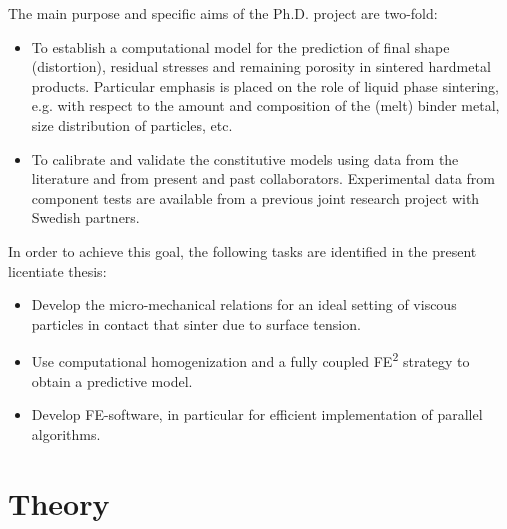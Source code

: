 \documentclass[MikaelDissertation.tex]{subfiles}
\begin{document}
The main purpose and specific aims of the Ph.D. project are two-fold:
\begin{itemize}
\item To establish a computational model for the prediction of final shape (distortion), residual stresses and remaining porosity in sintered hardmetal products.
Particular emphasis is placed on the role of liquid phase sintering, e.g. with respect to the amount and composition of the (melt) binder metal, size distribution of particles, etc.

\item To calibrate and validate the constitutive models using data from the literature and from present and past collaborators.
Experimental data from component tests are available from a previous joint research project with Swedish partners.
\end{itemize}
In order to achieve this goal, the following tasks are identified in the present licentiate thesis:
\begin{itemize}
 \item Develop the micro-mechanical relations for an ideal setting of viscous particles in contact that sinter due to surface tension.
 \item Use computational homogenization and a fully coupled FE\textsuperscript{2} strategy to obtain a predictive model.
 \item Develop FE-software, in particular for efficient implementation of parallel algorithms.
\end{itemize}

\chapter{Theory}

\end{document}
